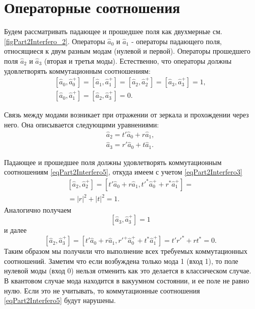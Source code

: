 \section{Операторные соотношения}
Будем рассматривать падающее и прошедшее поля как двухмерные
см. \autoref{figPart2Interfero_2}. Операторы $\hat{a}_0$ и 
$\hat{a}_1$ - операторы падающего поля, относящиеся к двум разным модам
(нулевой и первой). Операторы прошедшего поля $\hat{a}_2$ и 
$\hat{a}_3$ (вторая и третья моды). Естественно, что операторы должны
удовлетворять коммутационным соотношениям:
\begin{eqnarray}
\left[\hat{a}_0, \hat{a}_0^{+}\right] = 
\left[\hat{a}_1, \hat{a}_1^{+}\right] = 
\left[\hat{a}_2, \hat{a}_2^{+}\right] = 
\left[\hat{a}_3, \hat{a}_3^{+}\right] = 1,
\nonumber \\
\left[\hat{a}_0, \hat{a}_1^{+}\right] = 
\left[\hat{a}_2, \hat{a}_3^{+}\right] = 0.
\label{eqPart2Interfero5}
\end{eqnarray}



Связь между модами возникает при отражении от зеркала и прохождении
через него. Она описывается следующими уравнениями:
\begin{eqnarray}
\hat{a}_2 = t' \hat{a}_0 + r \hat{a}_1,
\nonumber \\
\hat{a}_3 = r' \hat{a}_0 + t \hat{a}_1.
\label{eqPart2Interfero6}
\end{eqnarray}

Падающее и прошедшее поля должны удовлетворять коммутационным
соотношениям \eqref{eqPart2Interfero5}, откуда имеем  с учетом 
\eqref{eqPart2Interfero3}
\begin{eqnarray}
\left[\hat{a}_2, \hat{a}_2^{+}\right] = 
\left[t' \hat{a}_0 + r \hat{a}_1, t'^{*} \hat{a}_0^{+} + r^{*}
  \hat{a}_1^{+}\right] =
\nonumber \\ = 
\left|r\right|^2 + \left|t\right|^2 = 1.
\label{eqPart2InterferoTask2a}
\end{eqnarray}
Аналогично получаем 
\begin{equation}
\left[\hat{a}_3, \hat{a}_3^{+}\right] = 1 
\label{eqPart2InterferoTask2b}
\end{equation}
и далее
\begin{equation}
\left[\hat{a}_2, \hat{a}_3^{+}\right] = 
\left[t' \hat{a}_0 + r \hat{a}_1, 
r'^{+} \hat{a}_0^{+} + t^{*} \hat{a}_1^{+}\right] = 
t' r'^{*} + r t^{*} = 0.
\label{eqPart2InterferoTask2c}
\end{equation}
Таким образом мы получили что выполнение всех требуемых коммутационных
соотношений. Заметим что если возбуждена только мода 1 (вход 1), то
поле нулевой моды (вход 0) нельзя отменить как это делается в
классическом случае. В квантовом случае мода находится в вакуумном
состоянии, и ее поле не равно нулю. Если это не учитывать, то
коммутационные соотношения \eqref{eqPart2Interfero5} будут нарушены.

